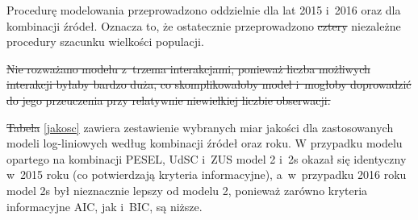 \documentclass[12pt,a4paper]{article}
\providecommand{\DIFadd}[1]{{\protect\color{blue}\uwave{#1}}} %
\providecommand{\DIFdel}[1]{{\protect\color{red}\sout{#1}}}                      %
\providecommand{\DIFaddbegin}{} %
\providecommand{\DIFaddend}{} %
\providecommand{\DIFdelbegin}{} %
\providecommand{\DIFdelend}{} %
\begin{document}
Procedurę modelowania przeprowadzono oddzielnie dla lat 2015 i~2016 oraz dla kombinacji źródeł. Oznacza to, że ostatecznie przeprowadzono \DIFdelbegin \DIFdel{cztery }\DIFdelend \DIFaddbegin \DIFadd{dwie }\DIFaddend niezależne procedury szacunku wielkości populacji. 

\DIFdelbegin \DIFdel{Nie rozważano modelu z~trzema interakcjami, ponieważ liczba możliwych interakcji byłaby bardzo duża, co skomplikowałoby model i~mogłoby doprowadzić do jego przeuczenia przy relatywnie niewielkiej liczbie obserwacji. 
}%

\DIFdel{Tabela }\DIFdelend \DIFaddbegin \DIFadd{Tablica }\DIFaddend \ref{jakosc} zawiera zestawienie wybranych miar jakości dla zastosowanych modeli log-liniowych według kombinacji źródeł oraz roku. W przypadku modelu opartego na kombinacji PESEL, UdSC i~ZUS model 2 i~2s okazał się identyczny w~2015 roku (co potwierdzają kryteria informacyjne), a~w~przypadku 2016 roku model 2s był nieznacznie lepszy od modelu 2, ponieważ zarówno kryteria informacyjne AIC, jak i~BIC, są niższe. 
\end{document}
